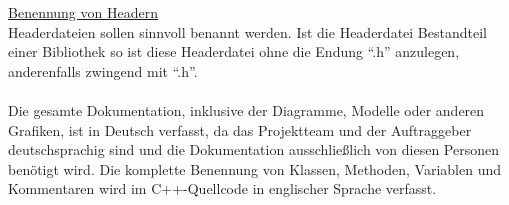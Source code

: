\underline{Benennung von Headern}\\
Headerdateien sollen sinnvoll benannt werden. Ist die Headerdatei Bestandteil einer Bibliothek so ist diese Headerdatei ohne die Endung "`.h"' anzulegen, anderenfalls zwingend mit "`.h"'.\\
\\
Die gesamte Dokumentation, inklusive der Diagramme, Modelle oder anderen Grafiken, ist in Deutsch verfasst, da das Projektteam und der Auftraggeber deutschsprachig sind und die Dokumentation ausschließlich von diesen Personen benötigt wird. Die komplette Benennung von Klassen, Methoden, Variablen und Kommentaren wird im C++-Quellcode in englischer Sprache verfasst.
